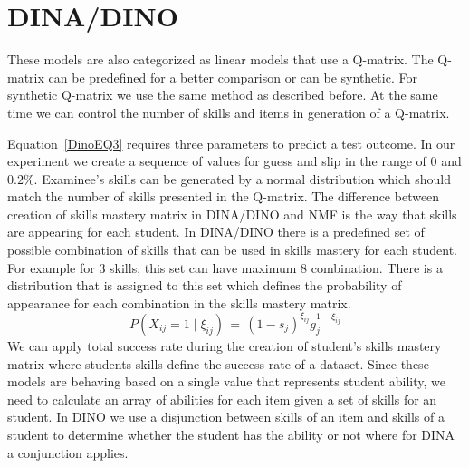 \section{DINA/DINO}
These models are also categorized as linear models that use a Q-matrix. The Q-matrix can be predefined for a better comparison or can be synthetic. For synthetic Q-matrix we use the same method as described before. At the same time we can control the number of skills and items in generation of a Q-matrix.

Equation~\ref{DinoEQ3} requires three parameters to predict a test outcome. In our experiment we create a sequence of values for guess and slip in the range of $0$ and $0.2\%$. Examinee's skills can be generated by a normal distribution which should match the number of skills presented in the Q-matrix. The difference between creation of skills mastery matrix in DINA/DINO and NMF is the way that skills are appearing for each student. In DINA/DINO there is a predefined set of possible combination of skills that can be used in skills mastery for each student. For example for 3 skills, this set can have maximum 8 combination. There is a distribution that is assigned to this set which defines the probability of appearance for each combination in the skills mastery matrix. 
\begin{equation}
 P(X_{ij} \!=\! 1 \; | \; \xi_{ij}) \,=\, (1-s_j)^{\xi_{ij}} g_j^{1-\xi_{ij}}
\label{DinoEQ3}
\end{equation}
We can apply total success rate during the creation of student's skills mastery matrix where students skills define the success rate of a dataset. Since these models are behaving based on a single value that represents student ability, we need to calculate an array of abilities for each item given a set of skills for an student. In DINO we use a disjunction between skills of an item and skills of a student to determine whether the student has the ability or not where for DINA a conjunction applies.


